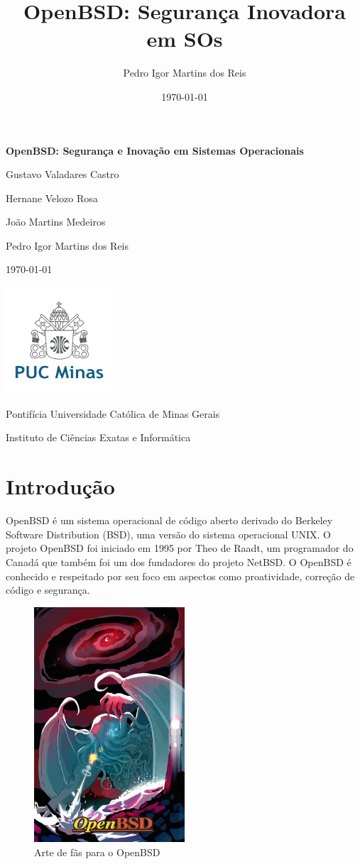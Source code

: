 \documentclass[a4paper,10pt]{article}
\title{OpenBSD: Segurança Inovadora em SOs}
\author{Pedro Igor Martins dos Reis}
\date{\today}
\begin{document}
\begin{titlepage}
    \centering
    {\Huge\bfseries OpenBSD: Segurança e Inovação em Sistemas Operacionais\par}
    \vspace{2cm}
    {\Large Gustavo Valadares Castro\par}
    {\Large Hernane Velozo Rosa\par}
    {\Large João Martins Medeiros\par}
    {\Large Pedro Igor Martins dos Reis\par}
    \vspace{2cm}
    {\large \today\par}
    \vfill
    \includegraphics[width=0.3\textwidth]{imagens/logo_pucminas.png}\par\vspace{1cm}
    {\large Pontifícia Universidade Católica de Minas Gerais\par}
    {\large Instituto de Ciências Exatas e Informática\par}
\end{titlepage}
\section{Introdução}
OpenBSD é um sistema operacional de código aberto derivado do Berkeley Software Distribution (BSD), uma versão do sistema operacional UNIX.
O projeto OpenBSD foi iniciado em 1995 por Theo de Raadt, um programador do Canadá que também foi um dos fundadores do projeto NetBSD. O OpenBSD é conhecido e respeitado por seu foco em aspectos como proatividade, correção de código e segurança.
\begin{figure}[!ht]
    \centering
    \includegraphics[width=0.5\textwidth]{imagens/puffy_vs_cthulhu.jpg}
    \caption{Arte de fãs para o OpenBSD}
\end{figure}
\end{document}
